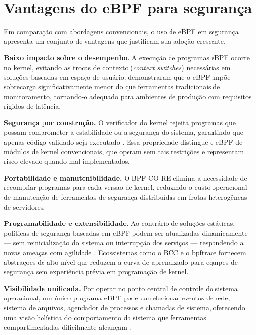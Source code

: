 \section{Vantagens do eBPF para segurança}

Em comparação com abordagens convencionais, o uso de eBPF em segurança apresenta
um conjunto de vantagens que justificam sua adoção crescente.

\textbf{Baixo impacto sobre o desempenho.}
A execução de programas eBPF ocorre no kernel, evitando as trocas de contexto
(\textit{context switches}) necessárias em soluções baseadas em espaço de usuário.
 demonstraram que o eBPF impõe sobrecarga significativamente
menor do que ferramentas tradicionais de monitoramento, tornando-o adequado para
ambientes de produção com requisitos rígidos de latência.

\textbf{Segurança por construção.}
O verificador do kernel rejeita programas que possam comprometer a estabilidade ou a
segurança do sistema, garantindo que apenas código validado seja executado
\cite{linuxkernel2024}.
Essa propriedade distingue o eBPF de módulos de kernel convencionais, que operam
sem tais restrições e representam risco elevado quando mal implementados.

\textbf{Portabilidade e manutenibilidade.}
O BPF CO-RE \cite{nakryiko2020} elimina a necessidade de recompilar programas para
cada versão de kernel, reduzindo o custo operacional de manutenção de ferramentas
de segurança distribuídas em frotas heterogêneas de servidores.

\textbf{Programabilidade e extensibilidade.}
Ao contrário de soluções estáticas, políticas de segurança baseadas em eBPF podem
ser atualizadas dinamicamente — sem reinicialização do sistema ou interrupção dos
serviços — respondendo a novas ameaças com agilidade \cite{gregg2019}.
Ecossistemas como o BCC \cite{bcc} e o bpftrace \cite{bpftrace} fornecem abstrações
de alto nível que reduzem a curva de aprendizado para equipes de segurança sem
experiência prévia em programação de kernel.

\textbf{Visibilidade unificada.}
Por operar no ponto central de controle do sistema operacional, um único programa
eBPF pode correlacionar eventos de rede, sistema de arquivos, agendador de processos
e chamadas de sistema, oferecendo uma visão holística do comportamento do sistema
que ferramentas compartimentadas dificilmente alcançam \cite{majors2022}.